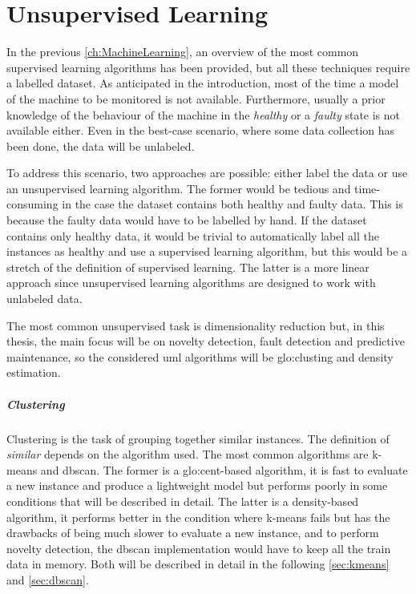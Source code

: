 \chapter{Unsupervised Learning}
\label{ch:Unsupervised}

In the previous \autoref{ch:MachineLearning}, an overview of the most common supervised learning algorithms has been provided, but all these techniques require a labelled dataset. As anticipated in the introduction, most of the time a model of the machine to be monitored is not available. Furthermore, usually a prior knowledge of the behaviour of the machine in the \emph{healthy} or a \emph{faulty} state is not available either. Even in the best-case scenario, where some data collection has been done, the data will be unlabeled. 

To address this scenario, two approaches are possible: either label the data or use an unsupervised learning algorithm. The former would be tedious and time-consuming in the case the dataset contains both healthy and faulty data. This is because the faulty data would have to be labelled by hand. If the dataset contains only healthy data, it would be trivial to automatically label all the instances as healthy and use a supervised learning algorithm, but this would be a stretch of the definition of supervised learning. The latter is a more linear approach since unsupervised learning algorithms are designed to work with unlabeled data.

The most common unsupervised task is dimensionality reduction  but, in this thesis, the main focus will be on novelty detection, fault detection and predictive maintenance, so the considered \gls{uml} algorithms will be \gls{glo:clust}ing and density estimation.

\paragraph[]{Clustering}
Clustering is the task of grouping together similar instances. The definition of \emph{similar} depends on the algorithm used. The most common algorithms are {k-means} and \gls{dbscan}. The former is a \gls{glo:cent}-based algorithm, it is fast to evaluate a new instance and produce a lightweight model but performs poorly in some conditions that will be described in detail. The latter is a density-based algorithm, it performs better in the condition where k-means fails but has the drawbacks of being much slower to evaluate a new instance, and to perform novelty detection, the \gls{dbscan} implementation would have to keep all the train data in memory. Both will be described in detail in the following \autoref{sec:kmeans} and \autoref{sec:dbscan}.

